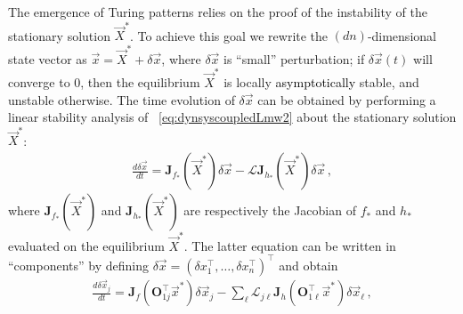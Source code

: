 \documentclass[aps,showpacs,preprintnumbers,amsmath,amssymb,twocolumn,superscriptaddress,floatfix,nofootinbib,10pt,pre]{revtex4-1}
\begin{document}
The emergence of Turing patterns relies on the proof of the instability of the stationary solution $\vec{X}^*$. To achieve this goal we rewrite the $(dn)$-dimensional state vector as $\vec{x}=\vec{X}^*+\delta\vec{x}$, where $\delta\vec{x}$ is ``small'' perturbation; if $\delta\vec{x}(t)$ will converge to $0$, then the equilibrium $\vec{X}^*$ is locally \textcolor{black}{asymptotically} stable, and unstable otherwise. The time evolution of $\delta\vec{x}$ can be obtained by performing a linear stability analysis of ~\eqref{eq:dynsyscoupledLmw2} about the stationary solution $\vec{X}^*$:
\begin{align}
\label{eq:lin1}
\frac{d\delta\vec{x}}{dt}=\mathbf{J}_{f_*}(\vec{X}^*)\delta\vec{x}-\mathcal{L}\mathbf{J}_{h_*}(\vec{X}^*)\delta\vec{x}\, ,
\end{align}
where $\mathbf{J}_{f_*}(\vec{X}^*)$ and $\mathbf{J}_{h_*}(\vec{X}^*)$ are respectively the Jacobian of ${f_*}$ and ${h_*}$ evaluated on the equilibrium $\vec{X}^*$. The latter equation can be written in ``components'' by defining $\delta\vec{x}=(\delta x_1^\top,\dots,\delta x_n^\top)^\top$ and obtain 
\begin{align}
\frac{d\delta \vec{x}_j}{dt}
 =\mathbf{J}_{f}(\mathbf{O}_{1j}^\top\vec{x}^*)
 \delta \vec{x}_j-\sum_\ell \mathcal{L}_{j\ell}\mathbf{J}_{h}(\mathbf{O}_{1\ell}^\top\vec{x}^*)
 \delta \vec{x}_\ell\, ,
\end{align}
\end{document}
